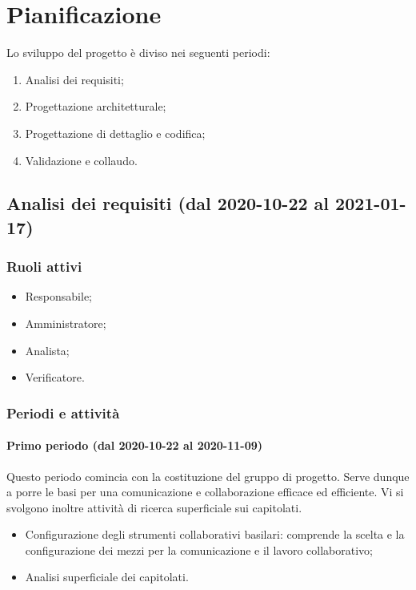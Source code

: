 \section{Pianificazione}



Lo sviluppo del progetto è diviso nei seguenti periodi:
\begin{enumerate}
	\item Analisi dei requisiti;
	\item Progettazione architetturale;
	\item Progettazione di dettaglio e codifica;
	\item Validazione e collaudo.
\end{enumerate} 

\subsection{Analisi dei requisiti (dal 2020-10-22 al 2021-01-17)}

\subsubsection{Ruoli attivi}
\begin{itemize}
	\item Responsabile;
	\item Amministratore;
	\item Analista;
	\item Verificatore.
\end{itemize}

\subsubsection{Periodi e attività}

\paragraph{Primo periodo (dal 2020-10-22 al 2020-11-09)}
Questo periodo comincia con la costituzione del gruppo di progetto. Serve dunque a porre le basi per una comunicazione e collaborazione efficace ed efficiente. Vi si svolgono inoltre attività di ricerca superficiale sui capitolati.

\begin{itemize}
	\item Configurazione degli strumenti collaborativi basilari: comprende la scelta e la configurazione dei mezzi per la comunicazione e il lavoro collaborativo;
	\item Analisi superficiale dei capitolati.
	
\end{itemize}


